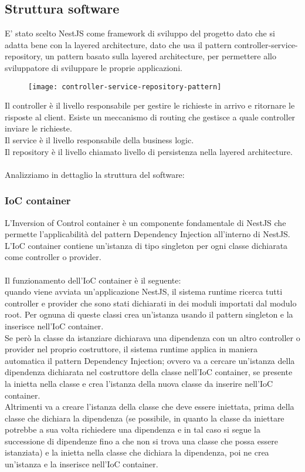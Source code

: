 \subsection{Struttura software}
E' stato scelto NestJS come framework di sviluppo del progetto dato che si adatta bene con la layered architecture,
dato che usa il pattern controller-service-repository, un pattern basato sulla layered architecture,  
per permettere allo sviluppatore di sviluppare le proprie applicazioni.
\begin{figure}[!h]
    \centering
    \texttt{[image: controller-service-repository-pattern]}
\end{figure}
\leavevmode\newline
Il controller è il livello responsabile per gestire le richieste in arrivo e ritornare le risposte al client.
Esiste un meccanismo di routing che gestisce a quale controller inviare le richieste.
\\
Il service è il livello responsabile della business logic.
\\
Il repository è il livello chiamato livello di persistenza nella layered architecture.
\\\\
Analizziamo in dettaglio la struttura del software:

\subsubsection{IoC container}
L'Inversion of Control container è un componente fondamentale di NestJS che permette l'applicabilità
del pattern Dependency Injection all'interno di NestJS.
\\
L'IoC container contiene un'istanza di tipo singleton per ogni classe dichiarata come controller o provider.
\\\\
Il funzionamento dell'IoC container è il seguente:
\\
quando viene avviata un'applicazione NestJS, il sistema runtime ricerca tutti controller e provider che 
sono stati dichiarati in dei moduli importati dal modulo root. Per ognuna di queste classi crea un'istanza
usando il pattern singleton e la inserisce nell'IoC container. 
\\
Se però la classe da istanziare dichiarava una dipendenza con un altro controller o provider nel proprio 
costruttore, il sistema runtime applica in maniera automatica il pattern Dependency Injection; ovvero
va a cercare un'istanza della dipendenza dichiarata nel costruttore della classe nell'IoC container, se
presente la inietta nella classe e crea l'istanza della nuova classe da inserire nell'IoC container. 
\\
Altrimenti va a creare
l'istanza della classe che deve essere iniettata, prima della classe che dichiara la dipendenza (se possibile, in quanto la
classe da iniettare potrebbe a sua volta richiedere una dipendenza e in tal caso si segue la successione di 
dipendenze fino a che non si trova una classe che possa essere istanziata) e la inietta nella classe che dichiara
la dipendenza, poi ne crea un'istanza e la inserisce nell'IoC container.

